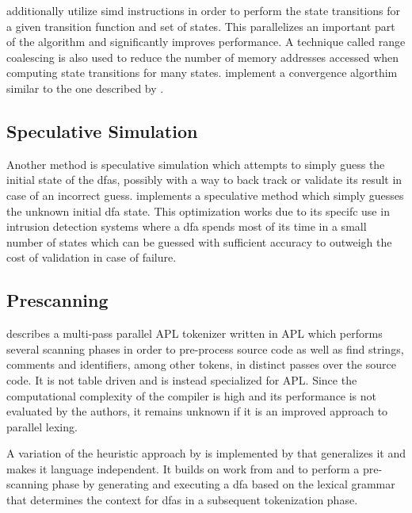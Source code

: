 \cite{mytkowicz_data-parallel_2014} additionally utilize \gls{simd} instructions
in order to perform the state transitions for a given transition function
and set of states. This parallelizes an important part of the algorithm and
significantly improves performance. A technique called range coalescing is also
used to reduce the number of memory addresses accessed when computing state
transitions for many states. \cite{zhao_--fly_2015} implement a convergence
algorthim similar to the one described by \cite{mytkowicz_data-parallel_2014}.

\subsection{Speculative Simulation} \label{speculative_simulation}

Another method is speculative simulation which attempts to simply guess the
initial state of the \gls{dfa}s, possibly with a way to back track or validate
its result in case of an incorrect guess. \cite{luchaup_multi-byte_2009,
luchaup_speculative_2011} implements a speculative method which simply guesses
the unknown initial \gls{dfa} state. This optimization works due to its specifc
use in intrusion detection systems where a \gls{dfa} spends most of its time
in a small number of states which can be guessed with sufficient accuracy to
outweigh the cost of validation in case of failure.

\subsection{Prescanning} \label{lit_prescanning}

\cite{bernecky_spmdsimd_2003} describes a multi-pass parallel APL tokenizer
written in APL which performs several scanning phases in order to pre-process
source code as well as find strings, comments and identifiers, among other
tokens, in distinct passes over the source code. It is not table driven and is
instead specialized for APL. Since the computational complexity of the compiler
is high and its performance is not evaluated by the authors, it remains unknown
if it is an improved approach to parallel lexing.

A variation of the heuristic approach by \cite{barenghi_parallel_2015} is
implemented by \cite{li_plex_2021} that generalizes it and makes it language
independent. It builds on work from \cite{sinya_simultaneous_2013} and
\cite{zhao_--fly_2015} to perform a pre-scanning phase by generating and
executing a \gls{dfa} based on the lexical grammar that determines the context
for \glspl{dfa} in a subsequent tokenization phase.


